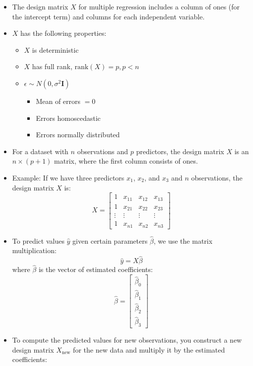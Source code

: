 \documentclass{article}
\begin{document}
\begin{itemize}
    \item The design matrix $X$ for multiple regression includes a column of ones (for the intercept term) and columns for each independent variable.
    \item $X$ has the following properties:
    \begin{itemize}
        \item $X$ is deterministic
        \item $X$ has full rank, $\text{rank}(X)=p, p<n$
        \item $\epsilon \sim N(0,\sigma^2\textbf{I})$
        \begin{itemize}
            \item Mean of errors $=0$
            \item Errors homoscedastic
            \item Errors normally distributed
        \end{itemize}
    \end{itemize}
    \item For a dataset with $n$ observations and $p$ predictors, the design matrix $X$ is an $n \times (p+1)$ matrix, where the first column consists of ones.
    \item Example: If we have three predictors $x_1$, $x_2$, and $x_3$ and $n$ observations, the design matrix $X$ is:
    \[
    X = \begin{bmatrix}
    1 & x_{11} & x_{12} & x_{13} \\
    1 & x_{21} & x_{22} & x_{23} \\
    \vdots & \vdots & \vdots & \vdots \\
    1 & x_{n1} & x_{n2} & x_{n3}
    \end{bmatrix}
    \]
    \item To predict values $\hat{y}$ given certain parameters $\hat{\beta}$, we use the matrix multiplication:
    \[
    \hat{y} = X\hat{\beta}
    \]
    where $\hat{\beta}$ is the vector of estimated coefficients:
    \[
    \hat{\beta} = \begin{bmatrix}
    \hat{\beta}_0 \\
    \hat{\beta}_1 \\
    \hat{\beta}_2 \\
    \hat{\beta}_3
    \end{bmatrix}
    \]
    \item To compute the predicted values for new observations, you construct a new design matrix $X_{\text{new}}$ for the new data and multiply it by the estimated coefficients:

\end{itemize}
\end{document}

